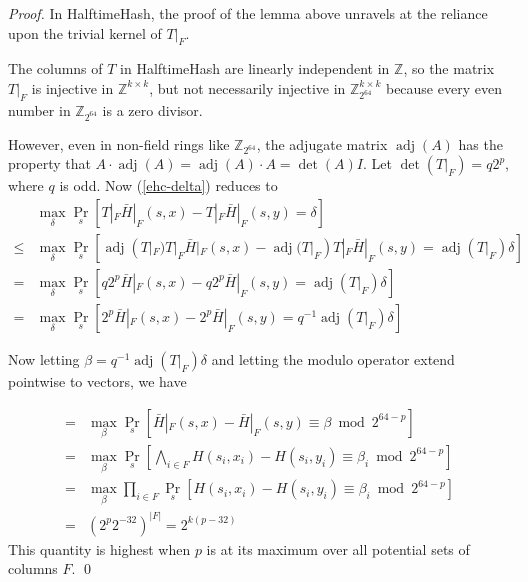 \documentclass[runningheads]{llncs}
\DeclareMathOperator{\adj}{adj}
\newcommand{\ints}{\mathbb{Z}}
\begin{document}
\begin{proof}
  In HalftimeHash, the proof of the lemma above unravels at the reliance upon the trivial kernel of $T|_F$.

  The columns of $T$ in HalftimeHash are linearly independent in $\ints$, so the matrix $T|_F$ is injective in $\ints^{k\times{}k}$, but not necessarily injective in $\ints_{2^{64}}^{k\times{}k}$ because every even number in $\ints_{2^{64}}$ is a zero divisor.

  However, even in non-field rings like $\ints_{2^{64}}$, the adjugate matrix $\adj(A)$ has the property that $A \cdot \adj(A) = \adj(A) \cdot A = \det(A) I$.
  Let $\det(T|_F) = q2^p$, where $q$ is odd.
  Now (\ref{ehc-delta}) reduces to
  \[
  \begin{array}{rl}
    &  \max_\delta \Pr_s[T|_F \bar{H}|_F(s,x) - T|_F \bar{H}|_F(s,y) = \delta]\\
    \leq & \max_\delta \Pr_s[\adj(T|_F) T|_F \bar{H}|_F(s,x) - \adj(T|_F) T|_F \bar{H}|_F(s,y) = \adj(T|_F) \delta] \\
    = & \max_\delta \Pr_s[q2^p\bar{H}|_F(s,x) - q2^p\bar{H}|_F(s,y) = \adj(T|_F) \delta] \\
    = & \max_\delta \Pr_s[2^p\bar{H}|_F(s,x) - 2^p\bar{H}|_F(s,y) = q^{-1} \adj(T|_F) \delta]
  \end{array}
  \]

  Now letting $\beta = q^{-1} \adj(T|_F) \delta$ and letting the modulo operator extend pointwise to vectors, we have

  \[
  \begin{array}{rl}
    = & \max_\beta \Pr_s[\bar{H}|_F(s,x) - \bar{H}|_F(s,y) \equiv \beta \bmod 2^{64-p}] \\
    = & \max_\beta \Pr_s\left[\bigwedge_{i \in F} H(s_i,x_i) - H(s_i,y_i) \equiv \beta_i \bmod 2^{64-p}\right] \\
    = & \max_\beta \prod_{i \in F} \Pr_s\left[ H(s_i,x_i) - H(s_i,y_i) \equiv \beta_i \bmod 2^{64-p}\right] \\
    = & \left(2^p 2^{-32}\right)^{|F|} = 2^{k(p-32)}
  \end{array}
  \]
  This quantity is highest when $p$ is at its maximum over all potential sets of columns $F$. \qed

\end{proof}



\end{document}
